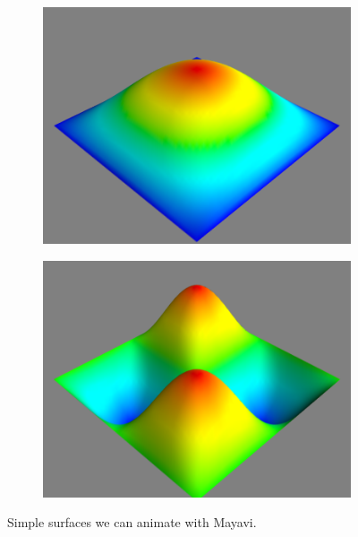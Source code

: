 \begin{figure}
\begin{subfigure}{.49\textwidth}
\includegraphics[width=\textwidth]{harmonic1.png}
\end{subfigure}
\begin{subfigure}{.49\textwidth}
\includegraphics[width=\textwidth]{harmonic2.png}
\end{subfigure}
\caption{Simple surfaces we can animate with Mayavi.}
\label{fig:harmonic_animations}
\end{figure}

